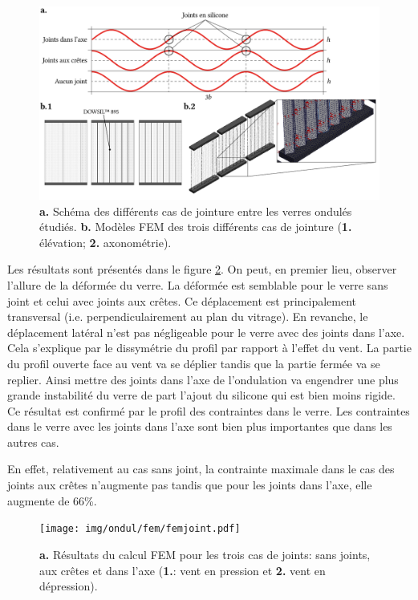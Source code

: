 \documentclass[11pt,titlepage]{article}
\begin{document}
\begin{figure}[H]
    \centering
    \includegraphics[width=\linewidth]{img/ondul/jointsq.pdf}
    \caption{\textbf{a. }Schéma des différents cas de jointure entre les verres ondulés étudiés. \textbf{b.} Modèles \acrshort{FEM} des trois différents cas de jointure (\textbf{1.} élévation; \textbf{2.} axonométrie).}
    \label{fig:jointsq}
\end{figure}

Les résultats sont présentés dans le figure \ref{fig:femjoints}. On peut, en premier lieu, observer l'allure de la déformée du verre. La déformée est semblable pour le verre sans joint et celui avec joints aux crêtes. Ce déplacement est principalement transversal (i.e. perpendiculairement au plan du vitrage). En revanche, le déplacement latéral n'est pas négligeable pour le verre avec des joints dans l'axe. Cela s'explique par le dissymétrie du profil par rapport à l'effet du vent. La partie du profil ouverte face au vent va se déplier tandis que la partie fermée va se replier. Ainsi mettre des joints dans l'axe de l'ondulation va engendrer une plus grande instabilité du verre de part l'ajout du silicone qui est bien moins rigide. Ce résultat est confirmé par le profil des contraintes dans le verre. Les contraintes dans le verre avec les joints dans l'axe sont bien plus importantes que dans les autres cas.

En effet, relativement au cas sans joint, la contrainte maximale dans le cas des joints aux crêtes n'augmente pas tandis que pour les joints dans l'axe, elle augmente de 66\%.  

\begin{figure}[H]
    \centering
    \texttt{[image: img/ondul/fem/femjoint.pdf]}
    \caption{\textbf{a.} Résultats du calcul \acrshort{FEM} pour les trois cas de joints: sans joints, aux crêtes et dans l'axe (\textbf{1.}: vent en pression et \textbf{2.} vent en dépression).}
    \label{fig:femjoints}
\end{figure} 
\end{document}
